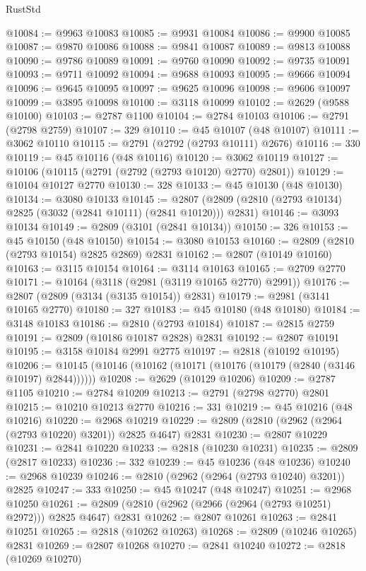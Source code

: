 \begin{lexlean}{RustStd}
\begin{coremodule}
@10084 := @9963 @10083
@10085 := @9931 @10084
@10086 := @9900 @10085
@10087 := @9870 @10086
@10088 := @9841 @10087
@10089 := @9813 @10088
@10090 := @9786 @10089
@10091 := @9760 @10090
@10092 := @9735 @10091
@10093 := @9711 @10092
@10094 := @9688 @10093
@10095 := @9666 @10094
@10096 := @9645 @10095
@10097 := @9625 @10096
@10098 := @9606 @10097
@10099 := @3895 @10098
@10100 := @3118 @10099
@10102 := @2629 (@9588 @10100)
@10103 := @2787 @1100
@10104 := @2784 @10103
@10106 := @2791 (@2798 @2759)
@10107 := 329
@10110 := @45 @10107 (@48 @10107)
@10111 := @3062 @10110
@10115 := @2791 (@2792 (@2793 @10111) @2676)
@10116 := 330
@10119 := @45 @10116 (@48 @10116)
@10120 := @3062 @10119
@10127 := @10106 (@10115 (@2791 (@2792 (@2793 @10120) @2770) @2801))
@10129 := @10104 @10127 @2770
@10130 := 328
@10133 := @45 @10130 (@48 @10130)
@10134 := @3080 @10133
@10145 := @2807 (@2809 (@2810 (@2793 @10134) @2825 (@3032 (@2841 @10111) (@2841 @10120))) @2831)
@10146 := @3093 @10134
@10149 := @2809 (@3101 (@2841 @10134))
@10150 := 326
@10153 := @45 @10150 (@48 @10150)
@10154 := @3080 @10153
@10160 := @2809 (@2810 (@2793 @10154) @2825 @2869) @2831
@10162 := @2807 (@10149 @10160)
@10163 := @3115 @10154
@10164 := @3114 @10163
@10165 := @2709 @2770
@10171 := @10164 (@3118 (@2981 (@3119 @10165 @2770) @2991))
@10176 := @2807 (@2809 (@3134 (@3135 @10154)) @2831)
@10179 := @2981 (@3141 @10165 @2770)
@10180 := 327
@10183 := @45 @10180 (@48 @10180)
@10184 := @3148 @10183
@10186 := @2810 (@2793 @10184)
@10187 := @2815 @2759
@10191 := @2809 (@10186 @10187 @2828) @2831
@10192 := @2807 @10191
@10195 := @3158 @10184 @2991 @2775
@10197 := @2818 (@10192 @10195)
@10206 := @10145 (@10146 (@10162 (@10171 (@10176 (@10179 (@2840 (@3146 @10197) @2844))))))
@10208 := @2629 (@10129 @10206)
@10209 := @2787 @1105
@10210 := @2784 @10209
@10213 := @2791 (@2798 @2770) @2801
@10215 := @10210 @10213 @2770
@10216 := 331
@10219 := @45 @10216 (@48 @10216)
@10220 := @2968 @10219
@10229 := @2809 (@2810 (@2962 (@2964 (@2793 @10220) @3201)) @2825 @4647) @2831
@10230 := @2807 @10229
@10231 := @2841 @10220
@10233 := @2818 (@10230 @10231)
@10235 := @2809 (@2817 @10233)
@10236 := 332
@10239 := @45 @10236 (@48 @10236)
@10240 := @2968 @10239
@10246 := @2810 (@2962 (@2964 (@2793 @10240) @3201)) @2825
@10247 := 333
@10250 := @45 @10247 (@48 @10247)
@10251 := @2968 @10250
@10261 := @2809 (@2810 (@2962 (@2966 (@2964 (@2793 @10251) @2972))) @2825 @4647) @2831
@10262 := @2807 @10261
@10263 := @2841 @10251
@10265 := @2818 (@10262 @10263)
@10268 := @2809 (@10246 @10265) @2831
@10269 := @2807 @10268
@10270 := @2841 @10240
@10272 := @2818 (@10269 @10270)

\end{coremodule}
\end{lexlean}
